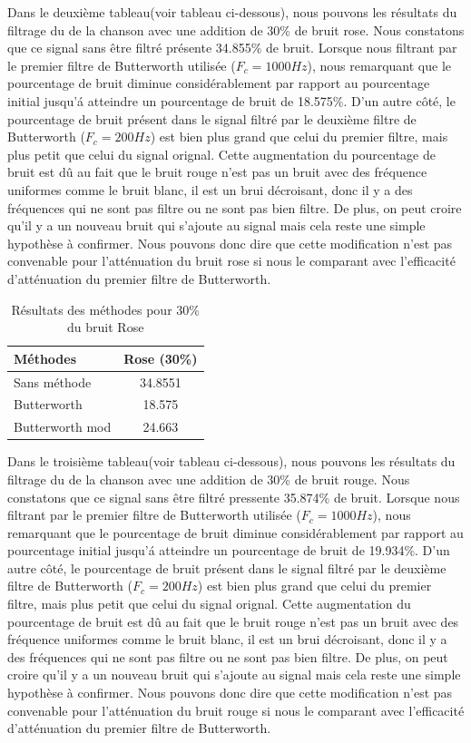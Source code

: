 \documentclass[conference,onecolumn]{IEEEtran}
\begin{document}
Dans le deuxième tableau(voir tableau ci-dessous), nous pouvons les résultats du filtrage du de la chanson avec une addition de 30\% de bruit rose. Nous constatons que ce signal sans être filtré présente 34.855\% de bruit. Lorsque nous filtrant par le premier filtre de Butterworth utilisée ($F_c = 1000 Hz$), nous remarquant que le pourcentage de bruit diminue considérablement par rapport au pourcentage initial jusqu'á atteindre un pourcentage de bruit de 18.575\%. D'un autre côté, le pourcentage de bruit présent dans le signal filtré par le deuxième filtre de Butterworth ($F_c = 200Hz$) est bien plus grand que celui du premier filtre, mais plus petit que celui du signal orignal. Cette augmentation du pourcentage de bruit est dû au fait que le bruit rouge n'est pas un bruit avec des fréquence uniformes comme le bruit blanc, il est un brui décroisant, donc il y a des fréquences qui ne sont pas filtre ou ne sont pas bien filtre. De plus, on peut croire qu'il y a un nouveau bruit qui s'ajoute au signal mais cela reste une simple hypothèse à confirmer. Nous pouvons donc dire que cette modification n'est pas convenable pour l'atténuation du bruit rose si nous le comparant avec l'efficacité d'atténuation du premier filtre de Butterworth.

\begin{table}[H]
    \centering
    \begin{tabular}{ l  c }
    \textbf{Méthodes} & \textbf{Rose (30\%)} \\
    \hline
    Sans méthode &  34.8551\\
    Butterworth &  18.575\\
    Butterworth mod &  24.663\\
    \end{tabular}
    \caption{Résultats des méthodes pour 30\% du bruit Rose}
    \label{table:t8}
\end{table}

Dans le troisième tableau(voir tableau ci-dessous), nous pouvons les résultats du filtrage du de la chanson avec une addition de 30\% de bruit rouge. Nous constatons que ce signal sans être filtré pressente 35.874\% de bruit. Lorsque nous filtrant par le premier filtre de Butterworth utilisée ($F_c = 1000 Hz$), nous remarquant que le pourcentage de bruit diminue considérablement par rapport au pourcentage initial jusqu'á atteindre un pourcentage de bruit de 19.934\%. D'un autre côté, le pourcentage de bruit présent dans le signal filtré par le deuxième filtre de Butterworth ($F_c = 200 Hz$) est bien plus grand que celui du premier filtre, mais plus petit que celui du signal orignal. Cette augmentation du pourcentage de bruit est dû au fait que le bruit rouge n'est pas un bruit avec des fréquence uniformes comme le bruit blanc, il est un brui décroisant, donc il y a des fréquences qui ne sont pas filtre ou ne sont pas bien filtre. De plus, on peut croire qu'il y a un nouveau bruit qui s'ajoute au signal mais cela reste une simple hypothèse à confirmer. Nous pouvons donc dire que cette modification n'est pas convenable pour l'atténuation du bruit rouge si nous le comparant avec l'efficacité d'atténuation du premier filtre de Butterworth.
\end{document}

